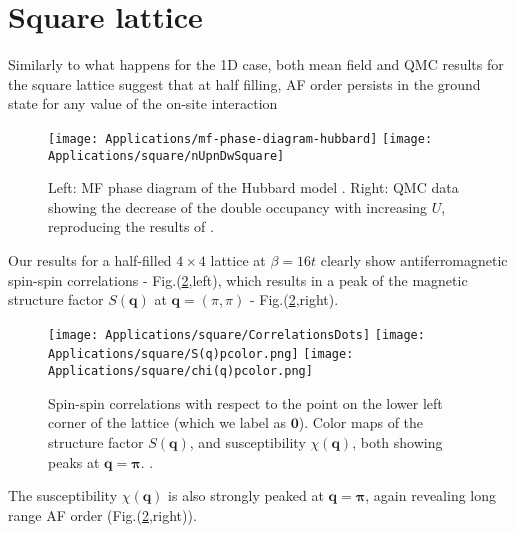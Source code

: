 \section{Square lattice}
\label{sec:square}

Similarly to what happens for the \acs{1D} case, both mean field and \ac{QMC} results for the square lattice suggest that at half filling, \ac{AF} order persists in the ground state for any value of the on-site interaction \cite{claveau_mean-field_2014, gouveia_magnetic_2015, white_numerical_1989, hirsch_two-dimensional_1985}

\begin{figure}[H]
\label{fig:mfHubbardPhaseDiagram}
\hspace{-0.18cm}
\texttt{[image: Applications/mf-phase-diagram-hubbard]}
\texttt{[image: Applications/square/nUpnDwSquare]}
\caption[Mean field phase diagram of the Hubbard model. \ac{QMC} data showing the decrease of the double occupancy with increasing $U$.]{Left: MF phase diagram of the Hubbard model \cite{gouveia_magnetic_2015}.
Right: \ac{QMC} data showing the decrease of the double occupancy with increasing $U$, reproducing the results of \cite{white_numerical_1989}.}
\end{figure}
Our results for a half-filled $4 \times 4$ lattice at $\beta = 16 t$ clearly show antiferromagnetic spin-spin correlations - Fig.(\ref{fig:corrSq},left), which results in a peak of the magnetic structure factor $S (\bm q)$ at $\bm q = (\pi, \pi)$ - Fig.(\ref{fig:corrSq},right).
\begin{figure}[H]
\texttt{[image: Applications/square/CorrelationsDots]}
\texttt{[image: Applications/square/S(q)pcolor.png]}
\texttt{[image: Applications/square/chi(q)pcolor.png]}
\caption[Spin-spin correlations on the square lattice.
Magnetic structure factors showing a peak at $\bm q = \bm \pi$. Color maps of the structure factor $S ( \bm q)$, and susceptibility $\chi ( \bm q)$, both showing peaks at $\bm q = \bm\pi$.]{Spin-spin correlations with respect to the point on the lower left corner of the lattice (which we label as $\bm 0$).
Color maps of the structure factor $S ( \bm q)$, and susceptibility $\chi ( \bm q)$, both showing peaks at $\bm q = \bm\pi$.
 \label{fig:corrSq}.}
\end{figure}
The susceptibility $\chi ( \bm q) $ is also strongly peaked at $\bm q = \bm \pi$, again revealing long range \ac{AF} order (Fig.(\ref{fig:corrSq},right)).

